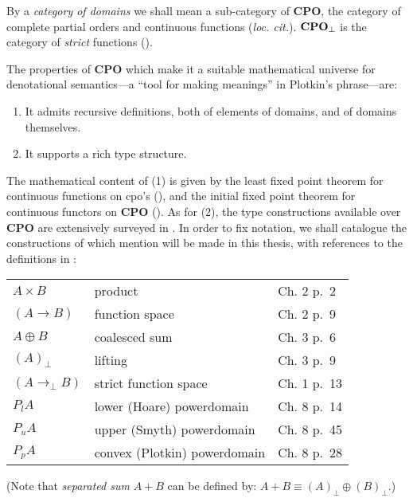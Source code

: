 By a {\it category of domains} we shall mean a sub-category of {\bf CPO}, the category of complete partial orders and continuous functions ({\it loc. cit.}). ${\bf CPO}_{\bot}$ is the category of {\it strict} functions 
(\cite[Chapter 1 p.\  11]{PloLN}).

The properties of {\bf CPO} which make it a suitable mathematical universe for denotational semantics---a ``tool for making meanings'' in Plotkin's phrase---are:
\begin{enumerate}
\item It admits recursive definitions, both of elements of domains, and of domains themselves.
\item It supports a rich type structure.
\end{enumerate}
The mathematical content of (1) is given by the least fixed point theorem for 
continuous functions on cpo's (\cite[Chapter 1 Theorem 1]{PloLN}), 
and the initial fixed point theorem for continuous functors on {\bf CPO} 
(\cite[Chapter 5 Theorem 1]{PloLN}).
As for (2), the type constructions available over {\bf CPO} are extensively 
surveyed in \cite[Chapters 2 and 3]{PloLN}.
In order to fix notation, we shall catalogue the constructions of which mention will be made in this thesis, with references to the definitions in \cite{PloLN}:
\begin{center}
\begin{tabular}{|l|l|l|} \hline
$A \times B$ & product & Ch. 2 p.\  2 \\
$(A \rightarrow B)$ & function space & Ch. 2 p.\  9 \\
$A \oplus B$ & coalesced sum & Ch. 3 p.\  6 \\
$(A)_{\bot}$ & lifting & Ch. 3 p.\  9 \\
$(A \rightarrow_{\bot} B)$ & strict function space & Ch. 1 p.\  13 \\
$P_{l} A$ & lower (Hoare) powerdomain & Ch. 8 p.\  14 \\
$P_{u} A$ & upper (Smyth) powerdomain & Ch. 8 p.\  45 \\
$P_{p} A$ & convex (Plotkin) powerdomain & Ch. 8 p.\  28 \\ \hline
\end{tabular}
\end{center}
(Note that {\em separated sum} $A + B$ can be defined by: $A + B \equiv (A)_{\bot} \oplus (B)_{\bot}$.)

